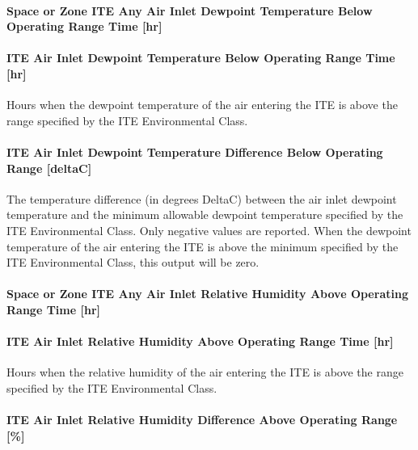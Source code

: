 \paragraph{Space or Zone ITE Any Air Inlet Dewpoint Temperature Below Operating Range Time {[}hr{]}}\label{zone-ite-any-air-inlet-dewpoint-temperature-below-operating-range-time-hr}

\paragraph{ITE Air Inlet Dewpoint Temperature Below Operating Range Time {[}hr{]}}\label{ite-air-inlet-dewpoint-temperature-below-operating-range-time-hr}

Hours when the dewpoint temperature of the air entering the ITE is above the range specified by the ITE Environmental Class.

\paragraph{ITE Air Inlet Dewpoint Temperature Difference Below Operating Range {[}deltaC{]}}\label{ite-air-inlet-dewpoint-temperature-difference-below-operating-range-deltac}

The temperature difference (in degrees DeltaC) between the air inlet dewpoint temperature and the minimum allowable dewpoint temperature specified by the ITE Environmental Class. Only negative values are reported. When the dewpoint temperature of the air entering the ITE is above the minimum specified by the ITE Environmental Class, this output will be zero.

\paragraph{Space or Zone ITE Any Air Inlet Relative Humidity Above Operating Range Time {[}hr{]}}\label{zone-ite-any-air-inlet-relative-humidity-above-operating-range-time-hr}

\paragraph{ITE Air Inlet Relative Humidity Above Operating Range Time {[}hr{]}}\label{ite-air-inlet-relative-humidity-above-operating-range-time-hr}

Hours when the relative humidity of the air entering the ITE is above the range specified by the ITE Environmental Class.

\paragraph{ITE Air Inlet Relative Humidity Difference Above Operating Range {[}\%{]}}\label{ite-air-inlet-relative-humidity-difference-above-operating-range}

